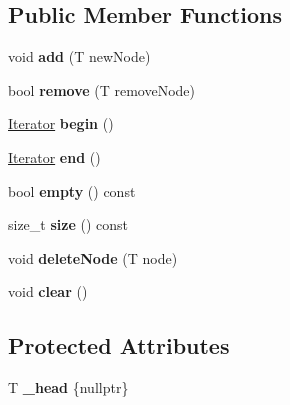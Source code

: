 \subsection*{Public Member Functions}
\begin{DoxyCompactItemize}
\item 
\mbox{\label{classIntrusiveSortedList_a7e0f7c2ef79d4eeee78378bf4c18a8b2}} 
void {\bfseries add} (T new\+Node)
\item 
\mbox{\label{classIntrusiveSortedList_aeed7f2131f31a3a3beb903b2cd435d48}} 
bool {\bfseries remove} (T remove\+Node)
\item 
\mbox{\label{classIntrusiveSortedList_a8e3b72bbc6de421d105f0669393fc7a2}} 
\hyperlink{structIntrusiveSortedList_1_1Iterator}{Iterator} {\bfseries begin} ()
\item 
\mbox{\label{classIntrusiveSortedList_a5a6ccf96da27b0df5e00ed19bf10fee4}} 
\hyperlink{structIntrusiveSortedList_1_1Iterator}{Iterator} {\bfseries end} ()
\item 
\mbox{\label{classIntrusiveSortedList_a61b74f65f9ff4288750e57a9d57ef414}} 
bool {\bfseries empty} () const
\item 
\mbox{\label{classIntrusiveSortedList_a3cd0ec0b219a557286783e0721cee520}} 
size\+\_\+t {\bfseries size} () const
\item 
\mbox{\label{classIntrusiveSortedList_a200409fcc5a1b32416052f03ab71f960}} 
void {\bfseries delete\+Node} (T node)
\item 
\mbox{\label{classIntrusiveSortedList_a029b06af9123b12532314790f36f53c6}} 
void {\bfseries clear} ()
\end{DoxyCompactItemize}
\subsection*{Protected Attributes}
\begin{DoxyCompactItemize}
\item 
\mbox{\label{classIntrusiveSortedList_a12b97da84a71bb8157907a954ec1490a}} 
T {\bfseries \+\_\+head} \{nullptr\}
\end{DoxyCompactItemize}


